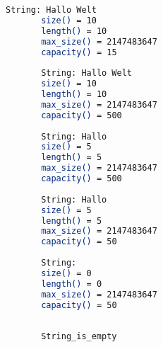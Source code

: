\documentclass[MES,Master,ngerman]{twbook}%
\begin{document}
\begin{figure}[!htb]
	\begin{subfigure}[b]{0.65\textwidth}
		
		\label{lst:11}
	\end{subfigure}
	\begin{subfigure}[b]{0.35\textwidth}
		\begin{lstlisting}[gobble=6, title={Ausgabe Quellcode (22)}, language=bash, numbers=none]
	   String: Hallo Welt                                                              
	   size() = 10                                                                     
	   length() = 10                                                                   
	   max_size() = 2147483647                                                         
	   capacity() = 15                                                                 
	                                                          
	   String: Hallo Welt                                                              
	   size() = 10                                                                     
	   length() = 10                                                                   
	   max_size() = 2147483647                                                         
	   capacity() = 500                                                                
	   
	   String: Hallo                                                                   
	   size() = 5                                                                      
	   length() = 5                                                                    
	   max_size() = 2147483647                                                         
	   capacity() = 500                                                                
	                                                                    
	   String: Hallo                                                                   
	   size() = 5                                                                      
	   length() = 5                                                                    
	   max_size() = 2147483647                                                         
	   capacity() = 50                                                                 
	   
	   String:                                                                         
	   size() = 0                                                                      
	   length() = 0                                                                    
	   max_size() = 2147483647                                                         
	   capacity() = 50
	   
	   
	   String_is_empty            
                               
                               
                                          	
		\end{lstlisting}
	\end{subfigure}
\end{figure}
\end{document}
